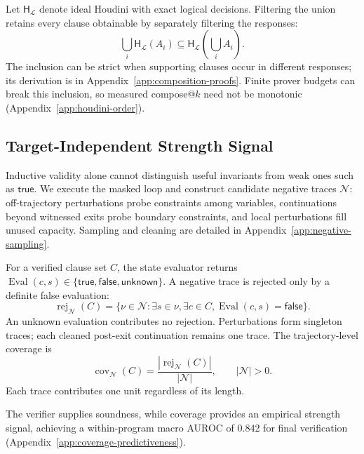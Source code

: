 Let \(\mathsf H_{\mathcal L}\) denote ideal Houdini with exact logical
decisions.  Filtering the union retains every clause obtainable by separately
filtering the responses:
\begin{equation}
 \bigcup_i\mathsf H_{\mathcal L}(A_i)
 \subseteq\mathsf H_{\mathcal L}\!\left(\bigcup_i A_i\right).
 \label{eq:main-pooling-inclusion}
\end{equation}
The inclusion can be strict when supporting clauses occur in different
responses; its derivation is in Appendix~\ref{app:composition-proofs}.
Finite prover budgets can break this inclusion, so measured compose@\(k\)
need not be monotonic (Appendix~\ref{app:houdini-order}).

\subsection{Target-Independent Strength Signal}
\label{sec:method:sampler}

Inductive validity alone cannot distinguish useful invariants from weak
ones such as \(\mathsf{true}\).  We execute the masked loop and construct
candidate negative traces \(\mathcal N\): off-trajectory perturbations probe
constraints among variables, continuations beyond witnessed exits probe
boundary constraints, and local perturbations fill unused capacity.  Sampling
and cleaning are detailed in Appendix~\ref{app:negative-sampling}.

For a verified clause set \(C\), the state evaluator returns
\(\operatorname{Eval}(c,s)\in\{\mathsf{true},\mathsf{false},\mathsf{unknown}\}\).
A negative trace is rejected only by a definite false evaluation:
\begin{equation}
 \operatorname{rej}_{\mathcal N}(C)=\{\nu\in\mathcal N:\exists s\in\nu,\exists c\in C,
   \operatorname{Eval}(c,s)=\mathsf{false}\}.
 \label{eq:main-negative-rejection}
\end{equation}
An unknown evaluation contributes no rejection.  Perturbations form
singleton traces; each cleaned post-exit continuation remains one trace.
The trajectory-level coverage is
\begin{equation}
  \operatorname{cov}_{\mathcal N}(C)=
  \frac{|\operatorname{rej}_{\mathcal N}(C)|}{|\mathcal N|},
  \qquad |\mathcal N|>0.
  \label{eq:method-coverage}
\end{equation}
Each trace contributes one unit regardless of its length.

The verifier supplies soundness, while coverage provides an empirical strength
signal, achieving a within-program macro AUROC of 0.842 for final
verification (Appendix~\ref{app:coverage-predictiveness}).

